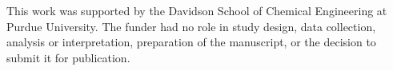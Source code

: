 This work was supported by the Davidson School of Chemical Engineering at Purdue University.
The funder had no role in study design, data collection, analysis or interpretation, preparation of the manuscript, or the decision to submit it for publication.
